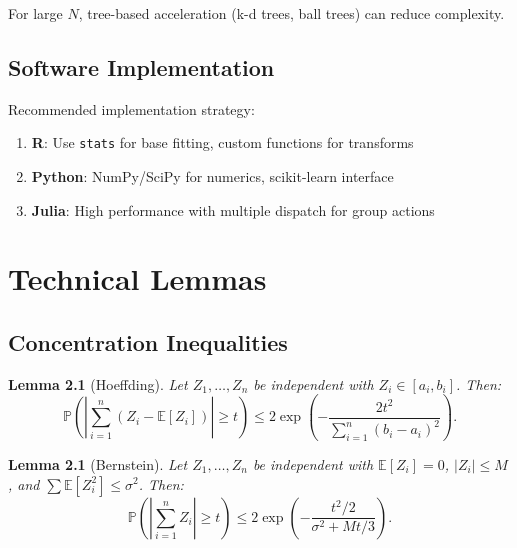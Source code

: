 \documentclass[11pt,twoside,openright]{book}
\theoremstyle{plain}
\newtheorem{lemma}[theorem]{Lemma}
\theoremstyle{definition}
\theoremstyle{remark}
\newcommand{\abs}[1]{|#1|}
\newcommand{\E}{\mathbb{E}}
\newcommand{\Prob}{\mathbb{P}}
\begin{document}
For large $N$, tree-based acceleration (k-d trees, ball trees) can reduce complexity.

\section{Software Implementation}

Recommended implementation strategy:
\begin{enumerate}
\item \textbf{R}: Use \texttt{stats} for base fitting, custom functions for transforms
\item \textbf{Python}: NumPy/SciPy for numerics, scikit-learn interface
\item \textbf{Julia}: High performance with multiple dispatch for group actions
\end{enumerate}

\backmatter

\appendix

\chapter{Technical Lemmas}
\label{app:lemmas}

\section{Concentration Inequalities}

\begin{lemma}[Hoeffding]
Let $Z_1, \ldots, Z_n$ be independent with $Z_i \in [a_i, b_i]$. Then:
\[
\Prob\left(\abs{\sum_{i=1}^n (Z_i - \E[Z_i])} \geq t\right) \leq 2\exp\left(-\frac{2t^2}{\sum_{i=1}^n (b_i - a_i)^2}\right).
\]
\end{lemma}

\begin{lemma}[Bernstein]
Let $Z_1, \ldots, Z_n$ be independent with $\E[Z_i] = 0$, $|Z_i| \leq M$, and $\sum \E[Z_i^2] \leq \sigma^2$. Then:
\[
\Prob\left(\abs{\sum_{i=1}^n Z_i} \geq t\right) \leq 2\exp\left(-\frac{t^2/2}{\sigma^2 + Mt/3}\right).
\]
\end{lemma}
\end{document}
